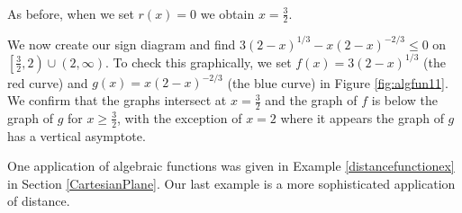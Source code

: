 {\begin{enumerate}
\begin{itemize}
\[\begin{array}{rclr}
       
\end{array}\]


As before, when we set $r(x) = 0$ we obtain $x = \frac{3}{2}$.


\end{itemize}

We now create our sign diagram and find  $3 (2-x)^{1/3} - x (2-x)^{-2/3} \leq 0$ on $\left[\frac{3}{2},2\right) \cup (2, \infty)$.  To check this graphically, we set $f(x)=3 (2-x)^{1/3}$ (the red curve) and $g(x) = x (2-x)^{-2/3}$ (the blue curve) in Figure \ref{fig:algfun11}. We confirm that the graphs intersect at $x=\frac{3}{2}$ and the graph of $f$ is below the graph of $g$ for $x \geq \frac{3}{2}$, with the exception of $x=2$ where it appears the graph of $g$ has a vertical asymptote. 


\end{enumerate}
}

One application of algebraic functions was given in Example \ref{distancefunctionex} in Section \ref{CartesianPlane}.  Our last example is a more sophisticated application of distance.

